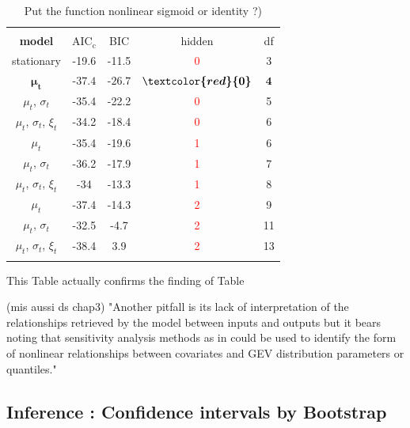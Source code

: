 \begin{table}[!htbp] 
	\centering \caption{Put the function nonlinear sigmoid or identity ?)} 
	\vspace{-.1cm}
	\label{tab:comp_mod} 
	\begin{tabular}{@{\extracolsep{5pt}} ccccc} 
		\\[-1.8ex]\hline 
		\hline  \\[-1.8ex] 
 			\textbf{model} & $\text{AIC}_{\text{c}}$ & BIC & hidden & df \\
 			\hline
 			stationary & -19.6 & -11.5 & \textcolor{red}{0} & 3 \\
 			$\boldsymbol{\mu_t}$ & -$\boldsymbol{37.4}$ & -$\boldsymbol{26.7}$ & $\boldsymbol{\textcolor{red}{0}}$ & $\boldsymbol{4}$  \\
 			$\mu_t$, $\sigma_t$ & -35.4 & -22.2 & \textcolor{red}{0} & 5 \\
 			$\mu_t$, $\sigma_t$, $\xi_t$ & -34.2 & -18.4 & \textcolor{red}{0} & 6 \\
 			$\mu_t$ & -35.4 & -19.6 & \textcolor{red}{1} & 6 \\
 			$\mu_t$, $\sigma_t$ &  -36.2  & -17.9 & \textcolor{red}{1} & 7 \\ 
 			$\mu_t$, $\sigma_t$, $\xi_t$ & -34 & -13.3 & \textcolor{red}{1} & 8 \\
 			$\mu_t$ & -37.4 & -14.3 & \textcolor{red}{2} & 9 \\
 			$\mu_t$, $\sigma_t$ & -32.5 & -4.7 & \textcolor{red}{2} & 11 \\
 			$\mu_t$, $\sigma_t$, $\xi_t$ & -38.4 & 3.9 & \textcolor{red}{2} & 13 \\
 			\hline \\[-1.8ex] 
 \end{tabular}
 	\vspace{-.15cm}
\end{table} 

This Table actually confirms the finding of Table 

 	
 	
 (mis aussi ds chap3) 
 "Another pitfall is its lack of interpretation of the relationships retrieved by the model between inputs and outputs but it bears noting that sensitivity analysis methods as in \citet{cannon_graph_2002} could be used to identify the form of nonlinear relationships between covariates and GEV distribution parameters or quantiles."
 
 
\subsection*{Inference : Confidence intervals by Bootstrap }
 
